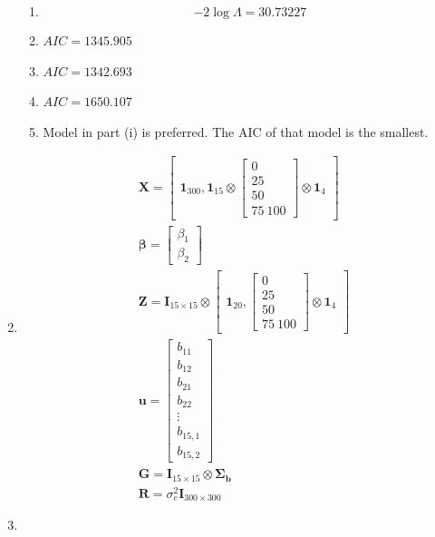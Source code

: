\documentclass{article}
\begin{document}
\begin{enumerate}[leftmargin = 0 em, label = \arabic*., font = \bfseries]
\begin{enumerate}
	\item 
	\[- 2 \log \Lambda = 30.73227\]

	\item 
	$AIC = 1345.905$

	\item 
	$AIC = 1342.693$

	\item 
	$AIC = 1650.107$

	\item 
	Model in part (i) is preferred. The AIC of that model is the smallest.
	
		\end{enumerate}

		\item 
		\begin{align*}
		& \bm X = \begin{bmatrix}
			\bm 1_{300}, \bm 1_{15} \otimes \begin{bmatrix}
				0 \\ 25 \\ 50 \\ 75 \ 100
			\end{bmatrix} \otimes \bm 1_{4}
		\end{bmatrix}\\
		& \bm \beta = \begin{bmatrix}
			\beta_1\\ \beta_2
		\end{bmatrix}\\
		& \bm Z = \bm I_{15 \times 15} \otimes \begin{bmatrix}
			\bm 1_{20} ,\begin{bmatrix}
				0 \\ 25 \\ 50 \\ 75 \ 100
			\end{bmatrix} \otimes \bm 1_{4} 
		\end{bmatrix}\\
		& \bm u = \begin{bmatrix}
			b_{11}\\ b_{12} \\ b_{21} \\ b_{22} \\ \vdots \\ b_{15,1} \\ b_{15 ,2}
		\end{bmatrix}\\
		& \bm G = \bm I_{15 \times 15} \otimes \bm \Sigma_{\bm b}\\
		& \bm R = \sigma_e^2 \bm I_{300 \times 300}
		\end{align*}
		\item 
		\begin{enumerate}


\end{enumerate}
\end{enumerate}
\end{document}
